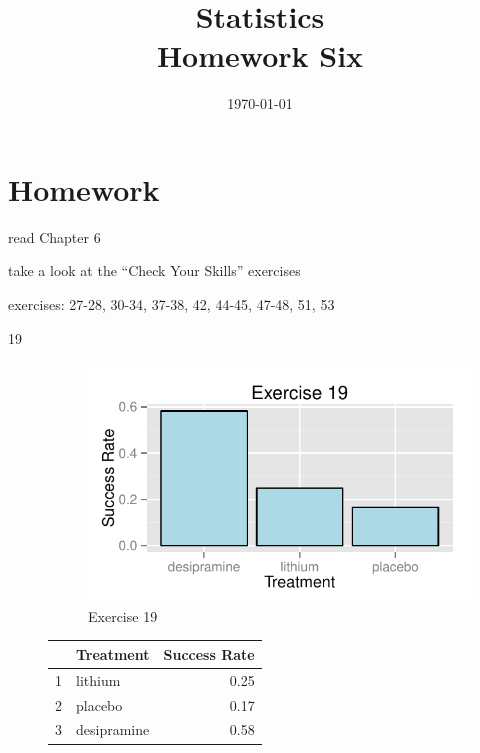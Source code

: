 \documentclass[letterpaper]{exam}
\title{Statistics \\ Homework Six}
\date{\today}
\author{}
\begin{document}
  \maketitle

  \section{Homework}
    \begin{itemize*}
      \item read Chapter 6 
      \item take a look at the ``Check Your Skills'' exercises
      \item exercises: 27-28, 30-34, 37-38, 42, 44-45, 47-48, 51, 53
    \end{itemize*}

  \ifprintanswers
    \begin{description}

      \item[19]     
        \begin{figure}[H]
          \centering
          \includegraphics{figures/ex19.pdf}
          \caption{Exercise 19}
        \end{figure}

        \begin{table}[H]
          \centering
          \begin{tabular}{rlr}
            \toprule
              & Treatment   & Success Rate \\
            \midrule
            1 & lithium     & 0.25 \\
            2 & placebo     & 0.17 \\
            3 & desipramine & 0.58 \\
            \bottomrule
          \end{tabular}
        \end{table}


\end{description}
\end{document}
